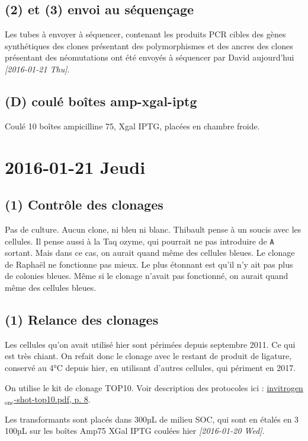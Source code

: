 \documentclass[9pt, oneside, twocolumn]{scrartcl}
\begin{document}
\subsection{(2) et (3) envoi au séquençage}
\label{sec:orgheadline67}
Les tubes à envoyer à séquencer, contenant les produits PCR cibles des gènes
synthétiques des clones présentant des polymorphismes et des ancres des clones
présentant des néomutations ont été envoyés à séquencer par David aujourd'hui
\textit{[2016-01-21 Thu]}. 

\subsection{(D) coulé boîtes amp-xgal-iptg}
\label{sec:orgheadline68}
Coulé 10 boîtes ampicilline 75, Xgal IPTG, placées en chambre froide.
\section{2016-01-21 Jeudi}
\label{sec:orgheadline73}
\subsection{(1) Contrôle des clonages}
\label{sec:orgheadline70}
Pas de culture. Aucun clone, ni bleu ni blanc. Thibault pense à un soucis avec
les cellules. Il pense aussi à la Taq ozyme, qui pourrait ne pas introduire de
\texttt{A} sortant. Mais dans ce cas, on aurait quand même des cellules bleues. Le
clonage de Raphaël ne fonctionne pas mieux. Le plus étonnant est qu'il n'y ait
pas plus de colonies bleues. Même si le clonage n'avait pas fonctionné, on
aurait quand même des cellules bleues.

\subsection{(1) Relance des clonages}
\label{sec:orgheadline71}
Les cellules qu'on avait utilisé hier sont périmées depuis septembre 2011. Ce
qui est très chiant. On refait donc le clonage avec le restant de produit de
ligature, conservé au 4°C depuis hier, en utilisant d'autres cellules, qui
périment en 2017. 

On utilise le kit de clonage TOP10. Voir description des protocoles ici :
\href{///Users/samuelbarreto/Dropbox/Cours/Master/Semestre4/StageM2/doc/invitrogen_one-shot-top10.pdf::8}{invitrogen\(_{\text{one}}\)-shot-top10.pdf, p. 8}.

Les transformants sont placés dans 300µL de milieu SOC, qui sont en étalés en 3
\texttimes{} 100µL sur les boîtes Amp75 XGal IPTG coulées hier \textit{[2016-01-20 Wed]}.
\end{document}
